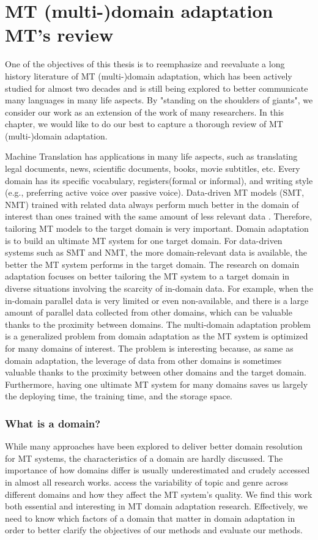 \chapter{MT (multi-)domain adaptation MT's review}
One of the objectives of this thesis is to reemphasize and reevaluate a long history literature of MT (multi-)domain adaptation, which has been actively studied for almost two decades and is still being explored to better communicate many languages in many life aspects. By "standing on the shoulders of giants", we consider our work as an extension of the work of many researchers. In this chapter, we would like to do our best to capture a thorough review of MT (multi-)domain adaptation.

Machine Translation has applications in many life aspects, such as translating legal documents, news, scientific documents, books, movie subtitles, etc. Every domain has its specific vocabulary, registers(formal or informal), and writing style (e.g., preferring active voice over passive voice). Data-driven MT models (SMT, NMT) trained with related data always perform much better in the domain of interest than ones trained with the same amount of less relevant data \citep{Rico13domain, Saunders21domain}. Therefore, tailoring MT models to the target domain is very important. Domain adaptation is to build an ultimate MT system for one target domain. For data-driven systems such as SMT and NMT, the more domain-relevant data is available, the better the MT system performs in the target domain. The research on domain adaptation focuses on better tailoring the MT system to a target domain in diverse situations involving the scarcity of in-domain data. For example, when the in-domain parallel data is very limited or even non-available, and there is a large amount of parallel data collected from other domains, which can be valuable thanks to the proximity between domains. The multi-domain adaptation problem is a generalized problem from domain adaptation as the MT system is optimized for many domains of interest. The problem is interesting because, as same as domain adaptation, the leverage of data from other domains is sometimes valuable thanks to the proximity between other domains and the target domain. Furthermore, having one ultimate MT system for many domains saves us largely the deploying time, the training time, and the storage space.
\subsection{What is a domain?}
While many approaches have been explored to deliver better domain resolution for MT systems, the characteristics of a domain are hardly discussed. The importance of how domains differ is usually underestimated and crudely accessed in almost all research works. \cite{Wees15Whats,Wees17Whats} access the variability of topic and genre across different domains and how they affect the MT system's quality. We find this work both essential and interesting in MT domain adaptation research. Effectively, we need to know which factors of a domain that matter in domain adaptation in order to better clarify the objectives of our methods and evaluate our methods.

